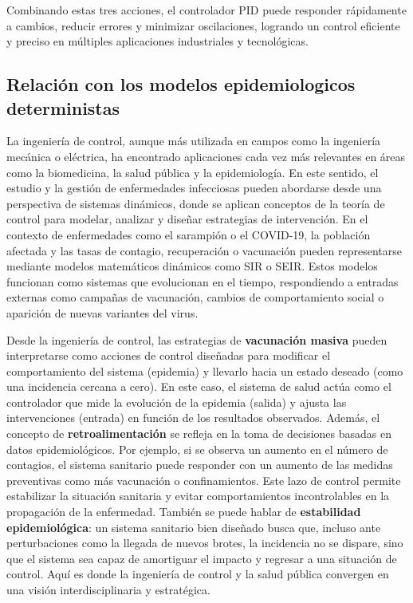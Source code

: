 Combinando estas tres acciones, el controlador PID puede responder rápidamente a cambios, reducir errores y minimizar oscilaciones, logrando un control eficiente y preciso en múltiples aplicaciones industriales y tecnológicas.


\subsection{Relación con los modelos epidemiologicos deterministas}
La ingeniería de control, aunque más utilizada en campos como la ingeniería mecánica o eléctrica, ha encontrado aplicaciones cada vez más relevantes en áreas como la biomedicina, la salud pública y la epidemiología. En este sentido, el estudio y la gestión de enfermedades infecciosas pueden abordarse desde una perspectiva de sistemas dinámicos, donde se aplican conceptos de la teoría de control para modelar, analizar y diseñar estrategias de intervención. En el contexto de enfermedades como el sarampión o el COVID-19, la población afectada y las tasas de contagio, recuperación o vacunación pueden representarse mediante modelos matemáticos dinámicos como SIR o SEIR. Estos modelos funcionan como sistemas que evolucionan en el tiempo, respondiendo a entradas externas como campañas de vacunación, cambios de comportamiento social o aparición de nuevas variantes del virus.

Desde la ingeniería de control, las estrategias de \textbf{vacunación masiva} pueden interpretarse como acciones de control diseñadas para modificar el comportamiento del sistema (epidemia) y llevarlo hacia un estado deseado (como una incidencia cercana a cero). En este caso, el sistema de salud actúa como el controlador que mide la evolución de la epidemia (salida) y ajusta las intervenciones (entrada) en función de los resultados observados.
Además, el concepto de \textbf{retroalimentación} se refleja en la toma de decisiones basadas en datos epidemiológicos. Por ejemplo, si se observa un aumento en el número de contagios, el sistema sanitario puede responder con un aumento de las medidas preventivas como más vacunación o confinamientos. Este lazo de control permite estabilizar la situación sanitaria y evitar comportamientos incontrolables en la propagación de la enfermedad.
También se puede hablar de \textbf{estabilidad epidemiológica}: un sistema sanitario bien diseñado busca que, incluso ante perturbaciones como la llegada de nuevos brotes, la incidencia no se dispare, sino que el sistema sea capaz de amortiguar el impacto y regresar a una situación de control. Aquí es donde la ingeniería de control y la salud pública convergen en una visión interdisciplinaria y estratégica.

